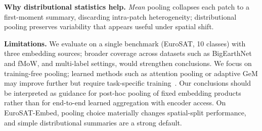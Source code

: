 \documentclass{article} %
\begin{document}
\textbf{Why distributional statistics help.}
\textit{Mean} pooling collapses each patch to a first-moment summary, discarding intra-patch heterogeneity; distributional pooling preserves variability that appears useful under spatial shift.

\textbf{Limitations.}
We evaluate on a single benchmark (EuroSAT, 10 classes) with three
embedding sources;
broader coverage across datasets such as BigEarthNet and fMoW, and multi-label settings,
would strengthen conclusions.
We focus on training-free pooling; learned methods such as attention pooling
or adaptive GeM may improve further but require task-specific
training~\citep{touvron2022augmenting}.
Our conclusions should be interpreted as guidance for post-hoc pooling of fixed
embedding products rather than for end-to-end learned aggregation with encoder
access.
On EuroSAT-Embed, pooling choice materially changes spatial-split
performance, and simple distributional summaries are a strong default.



\end{document}

